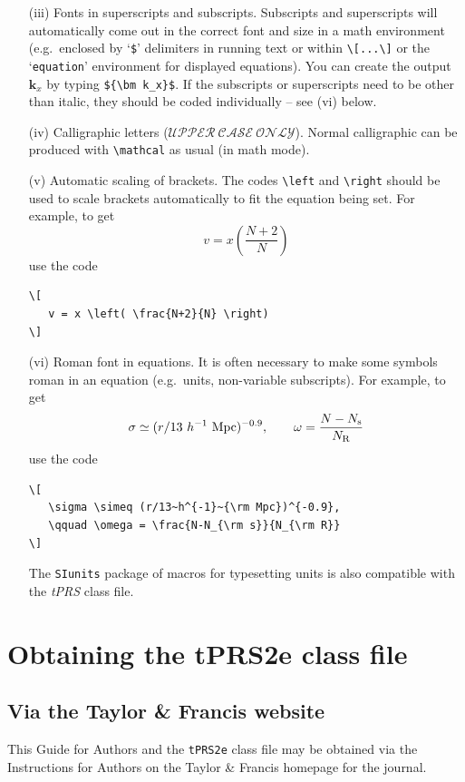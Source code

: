\documentclass{tPRS2e}
\begin{document}
\begin{enumerate}
\item[(iii)] Fonts in superscripts and subscripts. Subscripts and superscripts will automatically come out in the correct font
and size in a math environment (e.g.\ enclosed by `\verb"$"'
delimiters in running text or within \verb"\[...\]" or the
`\texttt{equation}' environment for displayed equations). You can create
the output ${\bm k_x}$ by typing \verb"${\bm k_x}$". If the
subscripts or superscripts need to be other than italic, they
should be coded individually -- see (vi) below.

\item[(iv)] Calligraphic letters ($\mathcal{UPPER\ CASE\ ONLY}$).
Normal calligraphic can be produced with \verb"\mathcal" as usual (in math mode).

\item[(v)] Automatic scaling of brackets. The codes \verb"\left" and
\verb"\right" should be used to scale brackets automatically to
fit the equation being set. For example, to get
\[
   v = x \left( \frac{N+2}{N} \right)
\]
use the code
\begin{verbatim}
\[
   v = x \left( \frac{N+2}{N} \right)
\]
\end{verbatim}

\item[(vi)] Roman font in equations. It is often necessary to make some symbols
roman in an equation (e.g.\ units, non-variable subscripts). For example, to get
\[
   \sigma \simeq (r/13~h^{-1}~{\rm Mpc})^{-0.9},
   \qquad \omega = \frac{N-N_{\rm s}}{N_{\rm R}}
\]
\noindent use the code
\begin{verbatim}
\[
   \sigma \simeq (r/13~h^{-1}~{\rm Mpc})^{-0.9},
   \qquad \omega = \frac{N-N_{\rm s}}{N_{\rm R}}
\]
\end{verbatim}
The \texttt{SIunits} package of macros for typesetting units is also compatible with the \textit{tPRS} class file.
\end{enumerate}


\section{Obtaining the tPRS2e class file}

\subsection{Via the Taylor \& Francis website}

This Guide for Authors and the \verb"tPRS2e" class file may be obtained via the Instructions for Authors
on the Taylor \& Francis homepage for the journal.
\end{document}
